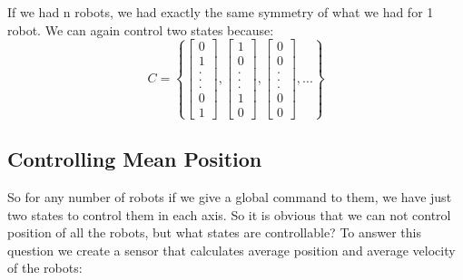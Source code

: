 \documentclass[10pt,letterpaper]{article}
\begin{document}
\begin{flushleft}
If we had n robots, we had exactly the same symmetry of what we had for 1 robot. We can again control two states because:
\begin{equation}
C=\left\{ \begin{bmatrix} 
0\\
1\\
.\\
.\\
.\\
0\\
1
\end{bmatrix}
,
  \begin{bmatrix} 
1\\
0\\
.\\
.\\
.\\
1\\
0
\end{bmatrix}
,
\begin{bmatrix} 
0\\
0\\
.\\
.\\
.\\
0\\
0
\end{bmatrix}, ... \right\}
\end{equation}  
\subsection{Controlling Mean Position}
So for any number of robots if we give a global command to them, we have just two states to control them in each axis. So it is obvious that we can not control position of all the robots, but what states are controllable? To answer this question we create a sensor that calculates average position and average velocity of the robots:\\


\end{flushleft}
\end{document}
